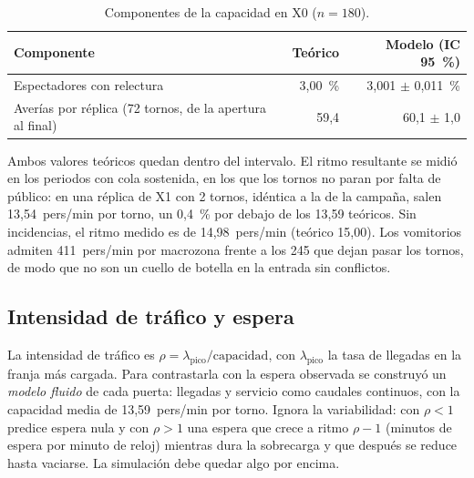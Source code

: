 \begin{table}[htbp]
\centering\small
\caption{Componentes de la capacidad en X0 ($n=180$).}
\label{tab:componentes}
\begin{tabular}{@{}lrr@{}}
\toprule
Componente & Teórico & Modelo (IC 95~\%) \\
\midrule
Espectadores con relectura & 3,00~\% & 3,001 $\pm$ 0,011~\% \\
Averías por réplica (72 tornos, de la apertura al final) & 59,4 & 60,1 $\pm$ 1,0 \\
\bottomrule
\end{tabular}
\end{table}

Ambos valores teóricos quedan dentro del intervalo. El ritmo resultante se midió
en los periodos con cola sostenida, en los que los tornos no paran por falta de
público: en una réplica de X1 con 2 tornos, idéntica a la de la campaña, salen
13,54~pers/min por torno, un 0,4~\% por debajo de los 13,59 teóricos. Sin
incidencias, el ritmo medido es de 14,98~pers/min (teórico 15,00). Los
vomitorios admiten 411~pers/min por macrozona frente a los 245 que dejan pasar los
tornos, de modo que no son un cuello de botella en la entrada sin conflictos.

\subsection{Intensidad de tráfico y espera}\label{sec:rho}

La intensidad de tráfico es $\rho = \lambda_{\text{pico}}/\text{capacidad}$, con
$\lambda_{\text{pico}}$ la tasa de llegadas en la franja más cargada. Para
contrastarla con la espera observada se construyó un \emph{modelo fluido} de cada
puerta: llegadas y servicio como caudales continuos, con la capacidad media de
13,59~pers/min por torno. Ignora la variabilidad: con $\rho<1$ predice espera
nula y con $\rho>1$ una espera que crece a ritmo $\rho-1$ (minutos de espera por
minuto de reloj) mientras dura la sobrecarga y que después se reduce hasta
vaciarse. La simulación debe quedar algo por encima.


